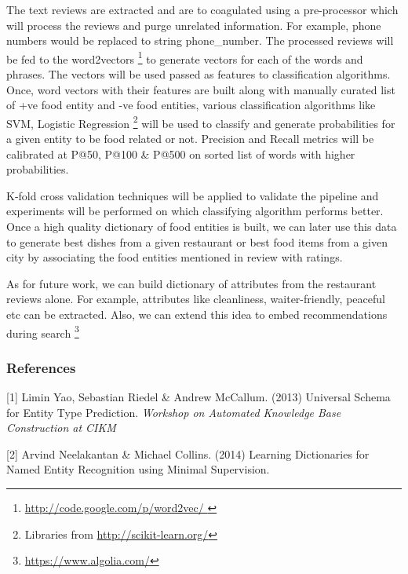 \documentclass{article} %
\begin{document}
The text reviews are extracted and are to coagulated using a pre-processor which will process the reviews and purge unrelated information. For example, phone numbers would be replaced to string phone\_number. The processed reviews will be fed to the word2vectors \footnote{ \url{http://code.google.com/p/word2vec/ } } to generate vectors for each of the words and phrases. The vectors will be used passed as features to classification algorithms. Once, word vectors with their features are built along with manually curated list of +ve food entity and -ve food entities, various classification algorithms like SVM, Logistic Regression \footnote{ Libraries from \url{http://scikit-learn.org/}} will be used to classify and generate probabilities for a given entity to be food related or not. Precision and Recall metrics will be calibrated at P@50, P@100 \& P@500 on sorted list of words with higher probabilities.

K-fold cross validation techniques will be applied to validate the pipeline and experiments will be performed on which classifying algorithm performs better. Once a high quality dictionary of food entities is built, we can later use this data to generate best dishes from a given restaurant or best food items from a given city by associating the food entities mentioned in review with ratings.

As for future work, we can build dictionary of attributes from the restaurant reviews alone. For example, attributes like cleanliness, waiter-friendly, peaceful etc can be extracted. Also, we can extend this idea to embed recommendations during search \footnote{ \url{https://www.algolia.com/}}

\subsubsection*{References}


\small{
[1] Limin Yao, Sebastian Riedel \& Andrew McCallum. (2013) 
Universal Schema for Entity Type Prediction. 
{\it Workshop on Automated Knowledge Base Construction at CIKM }

[2] Arvind Neelakantan \& Michael Collins. (2014)
Learning Dictionaries for Named Entity Recognition using Minimal Supervision. 
}
\end{document}
